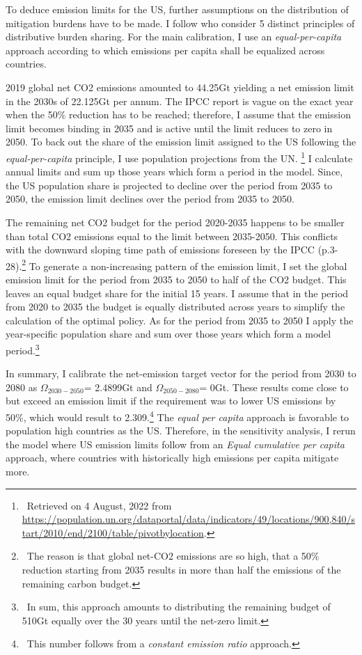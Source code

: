 To deduce emission limits for the US, further assumptions on the distribution of mitigation burdens have to be made. I follow \cite{RobiouDuPont2017EquitableGoals} who consider 5 distinct principles of distributive burden sharing. For the main calibration, I use an \textit{equal-per-capita} approach according to which emissions per capita shall be equalized across countries. 
 
 2019 global net CO2 emissions amounted to 44.25Gt \citep[compare figure SPM1.a in SPM, p.6][]{IPCC2022} yielding a net emission limit in the 2030s of 22.125Gt per annum. The IPCC report is vague on the exact year when the 50\% reduction has to be reached; therefore, I assume that the emission limit becomes binding in 2035 and is active until the limit reduces to zero in 2050. 
 To back out the share of the emission limit assigned to the US following the \textit{equal-per-capita} principle, I use population projections from the UN.
 \footnote{\ Retrieved on 4 August, 2022 from \url{https://population.un.org/dataportal/data/indicators/49/locations/900,840/start/2010/end/2100/table/pivotbylocation}.} 
 I calculate annual limits and sum up those years which form a period in the model.  Since, the US population share is projected to decline over the period from 2035 to 2050, the emission limit declines over the period from 2035 to 2050. 
 
 The remaining net CO2 budget for the period 2020-2035 happens to be smaller than total CO2 emissions equal to the limit between 2035-2050. This conflicts with the downward sloping time path of emissions foreseen by the IPCC (p.3-28).\footnote{\ The reason is that global net-CO2 emissions are so high, that a 50\% reduction starting from 2035 results in more than half the emissions of the remaining carbon budget. }
 To generate a non-increasing pattern of the emission limit, I set the global emission limit for the period from 2035 to 2050 to half of the CO2 budget. This leaves an equal budget share for the initial 15 years. I assume that in the period from 2020 to 2035 the budget is equally distributed across years to simplify the calculation of the optimal policy. As for the period from 2035 to 2050 I apply the year-specific population share and sum over those years which form a model period.\footnote{\ In sum, this approach amounts to distributing the remaining budget of 510Gt equally over the 30 years until the net-zero limit.} 
 
  In summary, I calibrate the net-emission target vector for the period from 2030 to 2080 as
 $\Omega_{2030-2050}$= 2.4899Gt and $\Omega_{2050-2080}$= 0Gt. 
 These results come close to but exceed an emission limit if the requirement was to lower US emissions by 50\%, which would result to 2.309.\footnote{\ This number follows from a \textit{constant emission ratio} approach.} The \textit{equal per capita} approach is favorable to population high countries as the US. Therefore, in the sensitivity analysis, I rerun the model where US emission limits follow from an \textit{Equal cumulative per capita} approach, where countries with historically  high emissions per capita mitigate more.
 
